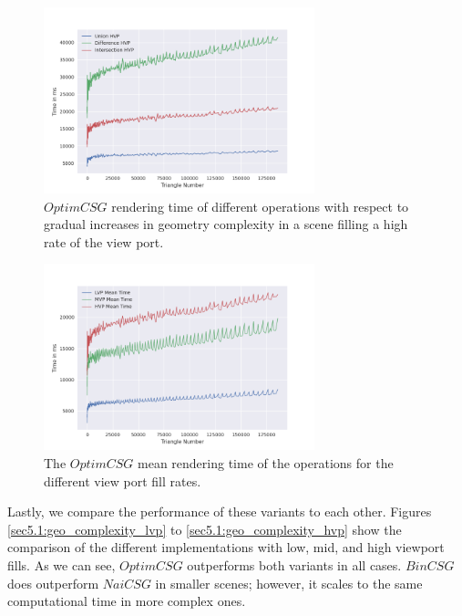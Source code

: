 \documentclass[a4paper,11pt,oneside]{article}
\begin{document}
\begin{figure}[H]
	\centering
	\includegraphics[width=0.7\textwidth]{section5/plots/optim_csg_hvp.png}
	\caption{$OptimCSG$ rendering time of different operations with respect to gradual increases in geometry complexity in a scene filling a high rate of the view port.}
	\label{sec5.1:optim_operations_hvp}
\end{figure}
\begin{figure}[H]
	\centering
	\includegraphics[width=0.7\textwidth]{section5/plots/optim_csg_mean.png}
	\caption{The $OptimCSG$ mean rendering time of the operations for the different view port fill rates.}
	\label{sec5.1:bin_operations}
\end{figure}

Lastly, we compare the performance of these variants to each other. Figures \ref{sec5.1:geo_complexity_lvp} to \ref{sec5.1:geo_complexity_hvp} show the comparison of the different implementations with low, mid, and high viewport fills. As we can see, $OptimCSG$ outperforms both variants in all cases. $BinCSG$ does outperform $NaiCSG$ in smaller scenes; however, it scales to the same computational time in more complex ones.
\end{document}
